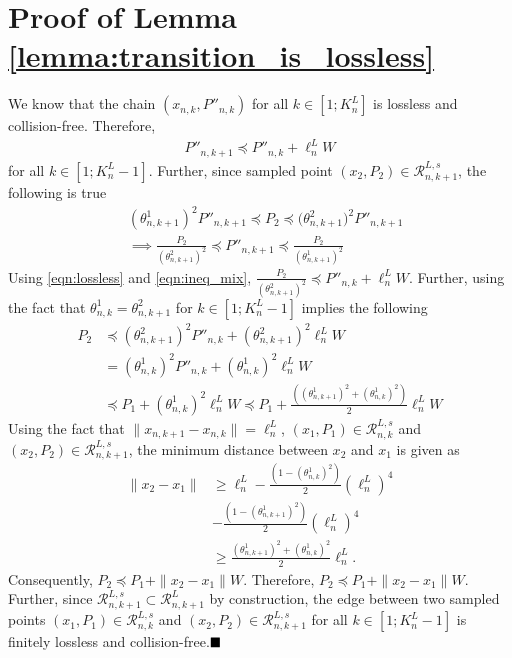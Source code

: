 \documentclass[Afour,sageh,times]{sagej}
\renewcommand{\qed}{\hfill\blacksquare}
\begin{document}
\section{Proof of Lemma \ref{lemma:transition_is_lossless}\label{appendix:transition_is_lossless}}
We know that the chain $(x_{n,k},P''_{n,k})$ for all $k\in[1;K^L_n]$ is lossless and collision-free. Therefore,
\begin{align}
    P''_{n,k+1}\preceq P''_{n,k}+\ell^L_nW
    \label{eqn:lossless}
\end{align}
for all $k\in[1;K^L_{n}-1]$. Further, since sampled point $(x_2,P_2)\in\mathcal{R}^{L,s}_{n,k+1}$, the following is true
\begin{align} \nonumber
    &(\theta^1_{n,k+1})^2P''_{n,k+1}\preceq P_2\preceq {(\theta^2_{n,k+1}})^2P''_{n,k+1}\nonumber\\
    &\implies  \frac{P_2}{(\theta^2_{n,k+1})^2}\preceq P''_{n,k+1}\preceq  \frac{P_2}{(\theta^1_{n,k+1})^2}
    \label{eqn:ineq_mix}
\end{align}
Using \eqref{eqn:lossless} and \eqref{eqn:ineq_mix}, $\frac{P_2}{(\theta^2_{n,k+1})^2}\preceq P''_{n,k}+\ell^L_nW$. 
Further, using the fact that $\theta^1_{n,k}=\theta^2_{n,k+1}$ for $k\in[1;K^L_n-1]$ implies the following
\begin{align} \nonumber
      {P_2}&\preceq {(\theta^2_{n,k+1})^2}P''_{n,k}+{(\theta^2_{n,k+1})^2}\ell^L_nW\\
      &={(\theta^1_{n,k})^2}P''_{n,k}+{(\theta^1_{n,k})^2}\ell^L_nW \nonumber\\
      &\preceq P_1+{(\theta^1_{n,k})^2}\ell^L_nW\preceq P_1+\frac{((\theta^1_{n,k+1})^2+(\theta^1_{n,k})^2)}{2}\ell^L_nW\nonumber
\end{align}
Using the fact that $\|x_{n,k+1}-x_{n,k}\|=\ell^L_n$, $(x_1,P_1)\in\mathcal{R}^{L,s}_{n,k}$ and $(x_2,P_2)\in\mathcal{R}^{L,s}_{n,k+1}$, the minimum distance between $x_2$ and $x_1$ is given as
\begin{align}
    \|x_2-x_1\|&\geq\ell^L_n-\frac{(1-(\theta^1_{n,k})^2)}{2}(\ell^L_n)^4\nonumber\\
    &-\frac{(1-(\theta^1_{n,k+1})^2)}{2}(\ell^L_n)^4\nonumber\\
    &\geq\frac{(\theta^1_{n,k+1})^2+(\theta^1_{n,k})^2}{2}\ell^L_n.\nonumber
\end{align}
Consequently, $P_2\preceq P_1+\|x_2-x_1\|W$.
Therefore, $P_2\preceq P_1+\|x_2-x_1\|W $. Further, since $\mathcal{R}^{L,s}_{n,k+1}\subset\mathcal{R}^L_{n,k+1}$ by construction, the edge between two sampled points $(x_1,P_1)\in\mathcal{R}^{L,s}_{n,k}$ and $(x_2,P_2)\in\mathcal{R}^{L,s}_{n,k+1}$ for all $k\in[1;K^L_n-1]$ is finitely lossless and collision-free.$\qed$
\end{document}
